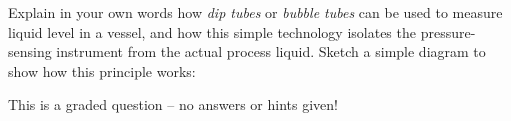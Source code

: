 

Explain in your own words how {\it dip tubes} or {\it bubble tubes} can be used to measure liquid level in a vessel, and how this simple technology isolates the pressure-sensing instrument from the actual process liquid.  Sketch a simple diagram to show how this principle works:

\vfil

\eject






This is a graded question -- no answers or hints given!












